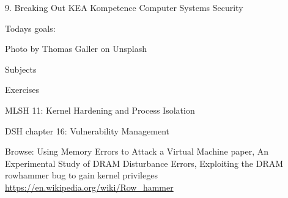 \documentclass[Screen16to9,17pt]{foils}
\begin{document}
\mytitlepage
{9. Breaking Out}
{KEA Kompetence Computer Systems Security \the\year}




Todays goals:
\begin{list2}
\item
\end{list2}

  Photo by Thomas Galler on Unsplash


\begin{list1}
\item Subjects
\begin{list2}
\item
\end{list2}
\item Exercises
\begin{list2}
\item
\end{list2}
\end{list1}




\begin{list1}
\item MLSH 11: Kernel Hardening and Process Isolation
\item DSH chapter 16: Vulnerability Management
\item Browse: Using Memory Errors to Attack a Virtual Machine paper, An Experimental Study of DRAM Disturbance Errors, Exploiting the DRAM rowhammer bug to gain kernel privileges \url{https://en.wikipedia.org/wiki/Row_hammer}
\end{list1}


\slidenext
\end{document}
